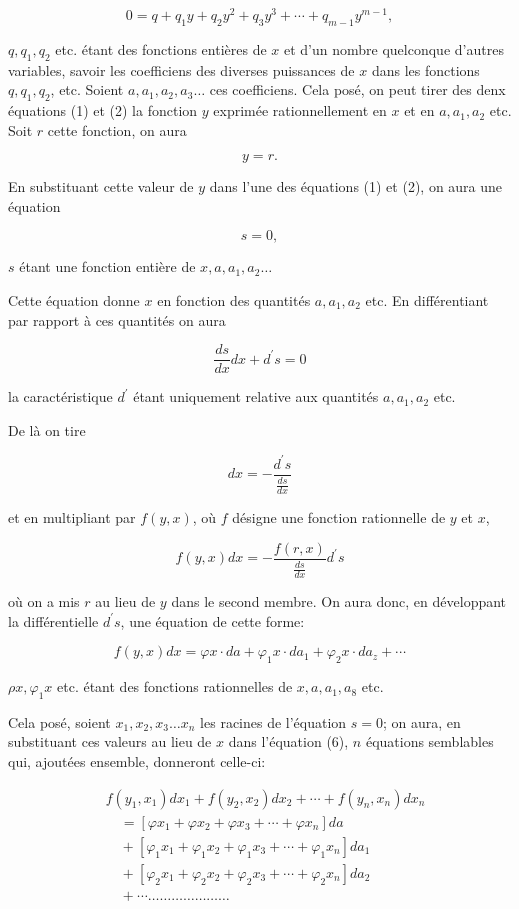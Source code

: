 \documentclass{article}
\begin{document}
\[
0=q+q_{1} y+q_{2} y^{2}+q_{3} y^{3}+\cdots+q_{m-1} y^{m-1},
\]

\(q, q_{1}, q_{2}\) etc. étant des fonctions entières de \(x\) et d'un nombre quelconque d'autres variables, savoir les coefficiens des diverses puissances de \(x\) dans les fonctions \(q, q_{1}, q_{2}\), etc. Soient \(a, a_{1}, a_{2}, a_{3} \ldots\) ces coefficiens. Cela posé, on peut tirer des denx équations (1) et (2) la fonction \(y\) exprimée rationnellement en \(x\) et en \(a, a_{1}, a_{2}\) etc. Soit \(r\) cette fonction, on aura

\[
y=r .
\]

En substituant cette valeur de \(y\) dans l'une des équations (1) et (2), on aura une équation

\[
s=0,
\]

\(s\) étant une fonction entière de \(x, a, a_{1}, a_{2} \ldots\)

Cette équation donne \(x\) en fonction des quantités \(a, a_{1}, a_{2}\) etc. En différentiant par rapport à ces quantités on aura

\[
\frac{d s}{d x} d x+d^{\prime} s=0
\]

la caractéristique \(d^{\prime}\) étant uniquement relative aux quantités \(a, a_{1}, a_{2}\) etc.

De là on tire

\[
d x=-\frac{d^{\prime} s}{\frac{d s}{d x}}
\]

et en multipliant par \(f(y, x)\), où \(f\) désigne une fonction rationnelle de \(y\) et \(x\),

\[
f(y, x) d x=-\frac{f(r, x)}{\frac{d s}{d x}} d^{\prime} s
\]

où on a mis \(r\) au lieu de \(y\) dans le second membre. On aura donc, en développant la différentielle \(d^{\prime} s\), une équation de cette forme:

\[
f(y, x) d x=\varphi x \cdot d a+\varphi_{1} x \cdot d a_{1}+\varphi_{2} x \cdot d a_{z}+\cdots
\]

\(\rho x, \varphi_{1} x\) etc. étant des fonctions rationnelles de \(x, a, a_{1}, a_{8}\) etc.

Cela posé, soient \(x_{1}, x_{2}, x_{3} \ldots x_{n}\) les racines de l'équation \(s=0\); on aura, en substituant ces valeurs au lieu de \(x\) dans l'équation (6), \(n\) équations semblables qui, ajoutées ensemble, donneront celle-ci:

\[
\begin{aligned}
& f\left(y_{1}, x_{1}\right) d x_{1}+f\left(y_{2}, x_{2}\right) d x_{2}+\cdots+f\left(y_{n}, x_{n}\right) d x_{n} \\
& \quad=\left[\varphi x_{1}+\varphi x_{2}+\varphi x_{3}+\cdots+\varphi x_{n}\right] d a \\
& \quad+\left[\varphi_{1} x_{1}+\varphi_{1} x_{2}+\varphi_{1} x_{3}+\cdots+\varphi_{1} x_{n}\right] d a_{1} \\
& \quad+\left[\varphi_{2} x_{1}+\varphi_{2} x_{2}+\varphi_{2} x_{3}+\cdots+\varphi_{2} x_{n}\right] d a_{2} \\
& \quad+\cdots \ldots \ldots \ldots \ldots \ldots \ldots \ldots
\end{aligned}
\]
\end{document}
